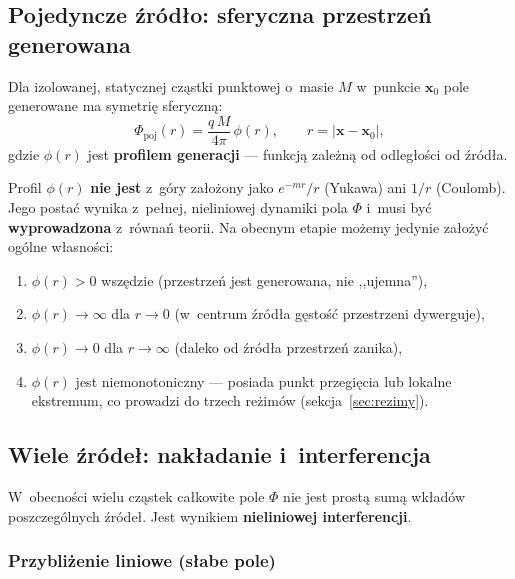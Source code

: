 \subsection{Pojedyncze \'zr\'od\l{}o: sferyczna
  przestrze\'n generowana}\label{ssec:pojedyncze}

Dla izolowanej, statycznej cz\k{a}stki punktowej o~masie $M$
w~punkcie $\mathbf{x}_0$ pole generowane ma symetri\k{e} sferyczn\k{a}:
\begin{equation}\label{eq:Phi-single}
    \Phi_{\mathrm{poj}}(r)
    = \frac{q\,M}{4\pi}\,\phi(r),
    \qquad
    r = |\mathbf{x} - \mathbf{x}_0|,
\end{equation}
gdzie $\phi(r)$ jest \textbf{profilem generacji} --- funkcj\k{a}
zale\.zn\k{a} od odleg\l{}o\'sci od \'zr\'od\l{}a.

Profil $\phi(r)$ \textbf{nie jest} z~g\'ory za\l{}o\.zony jako
$e^{-mr}/r$ (Yukawa) ani $1/r$ (Coulomb). Jego posta\'c wynika
z~pe\l{}nej, nieliniowej dynamiki pola $\Phi$ i~musi by\'c
\textbf{wyprowadzona} z~r\'owna\'n teorii. Na obecnym etapie
mo\.zemy jedynie za\l{}o\.zy\'c og\'olne w\l{}asno\'sci:
\begin{enumerate}[nosep]
  \item $\phi(r) > 0$ wsz\k{e}dzie (przestrze\'n jest generowana,
        nie ,,ujemna''),
  \item $\phi(r) \to \infty$ dla $r \to 0$ (w~centrum
        \'zr\'od\l{}a g\k{e}sto\'s\'c przestrzeni dywerguje),
  \item $\phi(r) \to 0$ dla $r \to \infty$ (daleko od \'zr\'od\l{}a
        przestrze\'n zanika),
  \item $\phi(r)$ jest niemonotoniczny --- posiada punkt przegi\k{e}cia
        lub lokalne ekstremum, co prowadzi do trzech re\.zim\'ow
        (sekcja~\ref{sec:rezimy}).
\end{enumerate}

\subsection{Wiele \'zr\'ode\l{}: nak\l{}adanie
  i~interferencja}\label{ssec:interferencja}

W~obecno\'sci wielu cz\k{a}stek ca\l{}kowite pole $\Phi$ nie jest
prost\k{a} sum\k{a} wk\l{}ad\'ow poszczeg\'olnych \'zr\'ode\l{}.
Jest wynikiem \textbf{nieliniowej interferencji}.

\subsubsection{Przybli\.zenie liniowe (s\l{}abe pole)}

